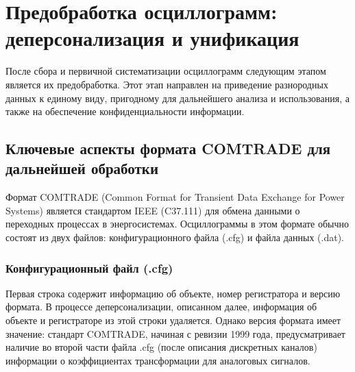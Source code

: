 
\section{Предобработка осциллограмм: деперсонализация и унификация}\label{sec:ch3_preprocessing_depersonalization}

После сбора и первичной систематизации осциллограмм следующим этапом является их
предобработка. Этот этап направлен на приведение разнородных данных к единому виду,
пригодному для дальнейшего анализа и использования, а также на обеспечение
конфиденциальности информации.\par\vspace{0.2cm}

\subsection{Ключевые аспекты формата COMTRADE для дальнейшей обработки}\label{sec:ch3_comtrade_aspects}

Формат COMTRADE (Common Format for Transient Data Exchange for Power Systems) является
стандартом IEEE (C37.111) для обмена данными о переходных процессах в энергосистемах.
Осциллограммы в этом формате обычно состоят из двух файлов: конфигурационного файла
(.cfg) и файла данных (.dat).\par\vspace{0.2cm}

\subsubsection{Конфигурационный файл (.cfg)}\label{sec:ch3_comtrade_cfg}

Первая строка содержит информацию об объекте, номер регистратора и версию формата. В
процессе деперсонализации, описанном далее, информация об объекте и регистраторе из этой
строки удаляется. Однако версия формата имеет значение: стандарт COMTRADE, начиная с
ревизии 1999 года, предусматривает наличие во второй части файла .cfg (после описания
дискретных каналов) информации о коэффициентах трансформации для аналоговых
сигналов.\par\vspace{0.2cm}

